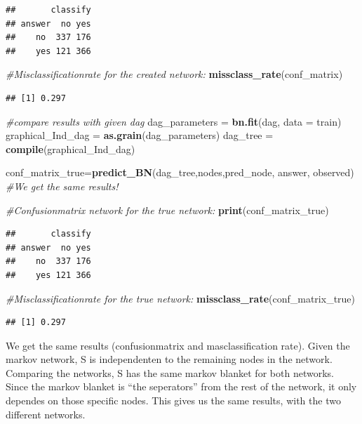 \documentclass[]{article}
\newenvironment{Shaded}{\begin{snugshade}}{\end{snugshade}}
\newcommand{\CommentTok}[1]{\textcolor[rgb]{0.56,0.35,0.01}{\textit{#1}}}
\newcommand{\DataTypeTok}[1]{\textcolor[rgb]{0.13,0.29,0.53}{#1}}
\newcommand{\KeywordTok}[1]{\textcolor[rgb]{0.13,0.29,0.53}{\textbf{#1}}}
\newcommand{\NormalTok}[1]{#1}
\newcommand{\StringTok}[1]{\textcolor[rgb]{0.31,0.60,0.02}{#1}}
\begin{document}
\begin{verbatim}
##       classify
## answer  no yes
##    no  337 176
##    yes 121 366
\end{verbatim}

\begin{Shaded}
\begin{Highlighting}[]
\CommentTok{#Misclassificationrate for the created network:}
\KeywordTok{missclass_rate}\NormalTok{(conf_matrix)}
\end{Highlighting}
\end{Shaded}

\begin{verbatim}
## [1] 0.297
\end{verbatim}

\begin{Shaded}
\begin{Highlighting}[]
\CommentTok{#compare results with given dag}
\NormalTok{dag_parameters =}\StringTok{ }\KeywordTok{bn.fit}\NormalTok{(dag, }\DataTypeTok{data =}\NormalTok{ train)}
\NormalTok{graphical_Ind_dag =}\StringTok{ }\KeywordTok{as.grain}\NormalTok{(dag_parameters)}
\NormalTok{dag_tree =}\StringTok{ }\KeywordTok{compile}\NormalTok{(graphical_Ind_dag)}


\NormalTok{conf_matrix_true=}\KeywordTok{predict_BN}\NormalTok{(dag_tree,nodes,pred_node, answer, observed) }\CommentTok{#We get the same results!}

\CommentTok{#Confusionmatrix network for the true network:}
\KeywordTok{print}\NormalTok{(conf_matrix_true)}
\end{Highlighting}
\end{Shaded}

\begin{verbatim}
##       classify
## answer  no yes
##    no  337 176
##    yes 121 366
\end{verbatim}

\begin{Shaded}
\begin{Highlighting}[]
\CommentTok{#Misclassificationrate for the true network:}
\KeywordTok{missclass_rate}\NormalTok{(conf_matrix_true)}
\end{Highlighting}
\end{Shaded}

\begin{verbatim}
## [1] 0.297
\end{verbatim}

We get the same results (confusionmatrix and masclassification rate).
Given the markov network, S is independenten to the remaining nodes in
the network. Comparing the networks, S has the same markov blanket for
both networks. Since the markov blanket is ``the seperators'' from the
rest of the network, it only dependes on those specific nodes. This
gives us the same results, with the two different networks.
\end{document}
